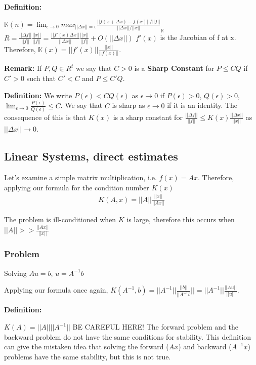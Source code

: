 \documentclass{article}
\newcommand{\n}{\newline}
\begin{document}
	\textbf{Definition:\n}
	
	$\mathbb{K}(n)=\lim_{\epsilon\rightarrow0}max_{||\Delta x||=\epsilon}\frac{||f(x+\Delta x)-f(x)||/||f||}{||\Delta x||/||x||}_{\mathbb{R}}$\n
	$R=\frac{||\Delta f||}{||f||}\frac{||x||}{||f||}=\frac{||f'(x)\Delta x||}{||\Delta x||}\frac{||x||}{||f||}+O(||\Delta x||)$\n
	$f'(x)$ is the Jacobian of f at x.  Therefore, $\mathbb{K}(x)=||f'(x)||\frac{||x||}{||f(x)||}$.\n
	
	\textbf{Remark: \n}
	If $P,Q\in R^{t}$ we say that $C>0$ is a \textbf{Sharp Constant} for $P\leq CQ$ if $C'>0$ such that $C'<C$ and $P\leq C'Q$.\n
	
	\textbf{Definition:\n}
	We write $P(\epsilon)<CQ(\epsilon)$ as $\epsilon\rightarrow0$ if $P(\epsilon)>0$, $Q(\epsilon)>0$, $\lim_{\epsilon\rightarrow0}\frac{P(\epsilon)}{Q(\epsilon)}\leq C$.  We say that $C$ is sharp as $\epsilon\rightarrow 0$ if it is an identity.  The consequence of this is that $K(x)$ is a sharp constant for $\frac{||\Delta f||}{||f||}\leq K(x)\frac{||\Delta x||}{||x||}$ as $||\Delta x||\rightarrow0$.
	
	\subsection{Linear Systems, direct estimates}
	
	Let's examine a simple matrix multiplication, i.e. $f(x)=Ax$.  Therefore, applying our formula for the condition number $K(x)$ \n
	\begin{align*}
		K(A,x)=||A||\frac{||x||}{||Ax||}
	\end{align*} 
	
	The problem is ill-conditioned when $K$ is large, therefore this occurs when $||A||>>\frac{||Ax||}{||x||}$

	\subsubsection{Problem}
	Solving $Au=b$, $u=A^{-1}b$\n
	
	Applying our formula once again, $K(A^{-1},b)=||A^{-1}||\frac{||b||}{||A^{-1}b}||=||A^{-1}||\frac{||Au||}{||u||}$.\n
	
	\textbf{Definition: \n}
	
	$K(A)=||A||||A^{-1}||$ BE CAREFUL HERE!  The forward problem and the backward problem do not have the same conditions for stability.  This definition can give the mistaken idea that solving the forward ($Ax$) and backward ($A^{-1}x$) problems have the same stability, but this is not true.
	
\end{document}
